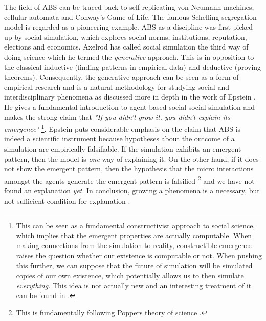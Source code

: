 The field of ABS can be traced back to self-replicating von Neumann machines, cellular automata and Conway's Game of Life. The famous Schelling segregation model \cite{schelling_dynamic_1971} is regarded as a pioneering example. ABS as a discipline was first picked up by social simulation, which explores social norms, institutions, reputation, elections and economics. Axelrod \cite{axelrod_advancing_1997, axelrod_guide_2006} has called social simulation the third way of doing science which he termed the \textit{generative} approach. This is in opposition to the classical inductive (finding patterns in empirical data) and deductive (proving theorems). Consequently, the generative approach can be seen as a form of empirical research and is a natural methodology for studying social and interdisciplinary phenomena as discussed more in depth in the work of Epstein \cite{epstein_chapter_2006, epstein_generative_2012}. He gives a fundamental introduction to agent-based social social simulation and makes the strong claim that \textit{"If you didn't grow it, you didn't explain its emergence"} \footnote{This can be seen as a fundamental constructivist approach to social science, which implies that the emergent properties are actually computable. When making connections from the simulation to reality, constructible emergence raises the question whether our existence is computable or not. When pushing this further, we can suppose that the future of simulation will be simulated copies of our own existence, which potentially allows us to then simulate \textit{everything}. This idea is not actually new and an interesting treatment of it can be found in \cite{bostrom_are_2003, steinhart_theological_2010}.}. 
Epstein puts considerable emphasis on the claim that ABS is indeed a scientific instrument because hypotheses about the outcome of a simulation are empirically falsifiable. If the simulation exhibits an emergent pattern, then the model is \textit{one} way of explaining it. On the other hand, if it does not show the emergent pattern, then the hypothesis that the micro interactions amongst the agents generate the emergent pattern is falsified \footnote{This is fundamentally following Poppers theory of science \cite{popper_logic_2002}.} and we have not found an explanation \textit{yet}. In conclusion, growing a phenomena is a necessary, but not sufficient condition for explanation \cite{epstein_chapter_2006}.


